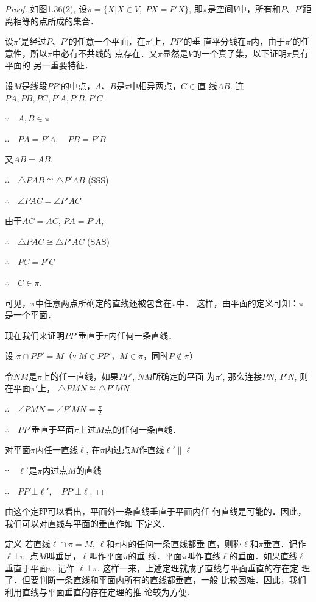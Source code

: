 \begin{proof}
如图1.36(2), 设$\pi=\{X|X\in V,\; PX=P'X\}$, 
即$\pi$是空间$V$中，所有和$P$、$P'$距离相等的点所成的集合．

设$\pi'$是经过$P$、$P'$的任意一个平面，在$\pi'$上，$PP'$的垂
直平分线在$\pi$内，由于$\pi'$的任意性，所以$\pi$中必有不共线的
点存在．又$\pi$显然是$V$的一个真子集，以下证明$\pi$具有平面的
另一重要特征．

设$M$是线段$PP'$的中点，$A$、$B$是$\pi$中相异两点，$C\in$直
线$AB$. 连$PA,PB,PC,P'A,P'B,P'C$.

$\because\quad A,B\in\pi$

$\therefore\quad PA=P'A,\quad PB=P'B$

又$AB=AB$,

$\therefore\quad \triangle PAB\cong \triangle P'AB$ (SSS)

$\therefore\quad \angle PAC=\angle P'AC$

由于$AC=AC$, $PA=P'A$,

$\therefore\quad \triangle PAC\cong\triangle P'AC$ (SAS)

$\therefore\quad PC=P'C$

$\therefore\quad C\in\pi$.

可见，$\pi$中任意两点所确定的直线还被包含在$\pi$中．
这样，由平面的定义可知：$\pi$是一个平面．

现在我们来证明$PP'$垂直于$\pi$内任何一条直线．

设 $\pi\cap PP'=M$（$\because\ M\in PP'$，$M\in\pi$，同时$P\notin\pi$）

令$NM$是$\pi$上的任一直线，如果$PP'$, $NM$所确定的平面
为$\pi'$, 那么连接$PN$, $P'N$, 则在平面$\pi'$上，
$\triangle PMN\cong \triangle P'MN$

$\therefore\quad \angle PMN=\angle P'MN=\frac{\pi}{2}$

$\therefore\quad PP'$垂直于平面$\pi$上过$M$点的任何一条直线．

对平面$\pi$内任一直线$\ell$, 在$\pi$内过点$M$作直线$\ell'\parallel \ell$

$\because\quad \ell'$是$\pi$内过点$M$的直线

$\therefore\quad PP'\bot \ell',\quad PP'\bot \ell$.
\end{proof}

由这个定理可以看出，平面外一条直线垂直于平面内任
何直线是可能的．因此，我们可以对直线与平面的垂直作如
下定义．

\begin{blk}
  {定义} 若直线$\ell\cap \pi=M$, $\ell$和$\pi$内的任何一条直线都垂
直，则称$\ell$和$\pi$垂直．记作$\ell\bot \pi$. 点$M$叫垂足，$\ell$叫作平面$\pi$的垂
线．平面$\pi$叫作直线$\ell$的垂面．如果直线$\ell$垂直于平面$\pi$, 记作
$\ell\bot \pi$. 这样一来，上述定理就成了直线与平面垂直的存在定
理了．但要判断一条直线和平面内所有的直线都垂直，一般
比较困难．因此，我们利用直线与平面垂直的存在定理的推
论较为方便．
\end{blk}

